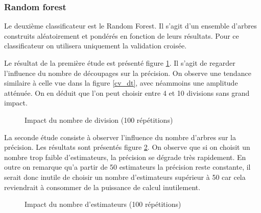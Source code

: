 \documentclass[11pt,a4paper]{article}
\begin{document}
		\subsubsection{Random forest}
		
			Le deuxième classificateur est le Random Forest. Il s'agit d'un ensemble d'arbres construits aléatoirement et pondérés en fonction de leurs résultats. Pour ce classificateur on utilisera uniquement la validation croisée.

			Le résultat de la première étude est présenté figure \ref{random_forest}. Il s'agit de regarder l'influence du nombre de découpages sur la précision. On observe une tendance similaire à celle vue dans la figure \ref{cv_dt}, avec néammoins une amplitude atténuée. On en déduit que l'on peut choisir entre 4 et 10 divisions sans grand impact.


			\begin{figure}
			\begin{center}
				\caption{Impact du nombre de division (100 répétitions)}
				\label{random_forest}
			\end{center}
			\end{figure}

			La seconde étude consiste à observer l'influence du nombre d'arbres sur la précision. Les résultats sont présentés figure \ref{rf_estimators}. On observe que si on choisit un nombre trop faible d'estimateurs, la précision se dégrade très rapidement. En outre on remarque qu'a partir de 50 estimateurs la précision reste constante, il serait donc inutile de choisir un nombre d'estimateurs supérieur à 50 car cela reviendrait à consommer de la puissance de calcul inutilement.

			\begin{figure}
			\begin{center}
				\caption{Impact du nombre d'estimateurs (100 répétitions)}
				\label{rf_estimators}
			\end{center}
			\end{figure}
\end{document}
